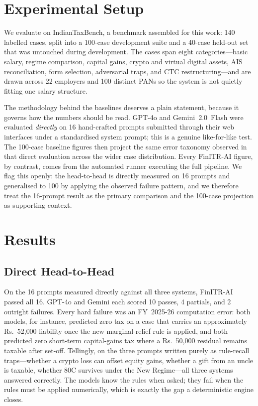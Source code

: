 \documentclass[conference]{IEEEtran}
\begin{document}
\section{Experimental Setup}
We evaluate on IndianTaxBench, a benchmark assembled for this work: 140 labelled
cases, split into a 100-case development suite and a 40-case held-out set that was
untouched during development. The cases span eight categories---basic salary,
regime comparison, capital gains, crypto and virtual digital assets, AIS
reconciliation, form selection, adversarial traps, and CTC restructuring---and
are drawn across 22 employers and 100 distinct PANs so the system is not quietly
fitting one salary structure.

The methodology behind the baselines deserves a plain statement, because it
governs how the numbers should be read. GPT-4o and Gemini~2.0~Flash were
evaluated \emph{directly} on 16 hand-crafted prompts submitted through their web
interfaces under a standardised system prompt; this is a genuine like-for-like
test. The 100-case baseline figures then project the same error taxonomy observed
in that direct evaluation across the wider case distribution. Every FinITR-AI
figure, by contrast, comes from the automated runner executing the full pipeline.
We flag this openly: the head-to-head is directly measured on 16 prompts and
generalised to 100 by applying the observed failure pattern, and we therefore
treat the 16-prompt result as the primary comparison and the 100-case projection
as supporting context.

\section{Results}
\subsection{Direct Head-to-Head}
On the 16 prompts measured directly against all three systems, FinITR-AI passed
all 16. GPT-4o and Gemini each scored 10 passes, 4 partials, and 2 outright
failures. Every hard failure was an FY~2025-26 computation error: both models, for
instance, predicted zero tax on a case that carries an approximately
Rs.~52{,}000 liability once the new marginal-relief rule is applied, and both
predicted zero short-term capital-gains tax where a Rs.~50{,}000 residual remains
taxable after set-off. Tellingly, on the three prompts written purely as
rule-recall traps---whether a crypto loss can offset equity gains, whether a
gift from an uncle is taxable, whether 80C survives under the New Regime---all
three systems answered correctly. The models know the rules when asked; they fail
when the rules must be applied numerically, which is exactly the gap a
deterministic engine closes.
\end{document}
